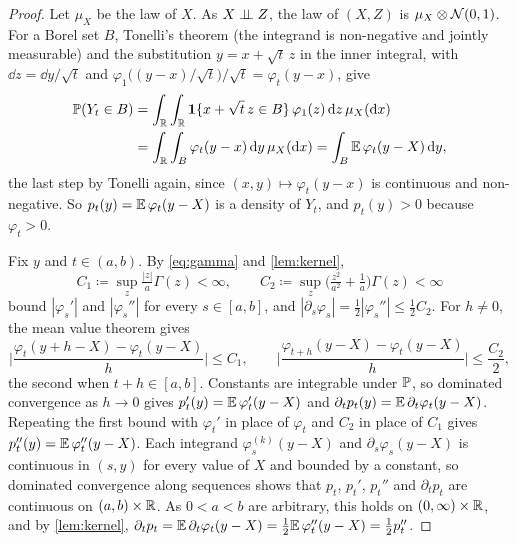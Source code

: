 \documentclass{saim-blog}
\begin{document}
\begin{proof}
Let $\mu_X$ be the law of $X$. As $X\mathrel{\perp\!\!\!\perp} Z$, the law of $(X,Z)$ is $\mu_X\otimes\mathcal{N}(0,1)$. For a Borel set $B$, Tonelli's theorem (the integrand is non-negative and jointly measurable) and the substitution $y=x+\sqrt t\,z$ in the inner integral, with $\dd z=\dd y/\sqrt t$ and $\varphi_1\big((y-x)/\sqrt t\big)/\sqrt t=\varphi_t(y-x)$, give
\[
\begin{aligned}
\mathbb{P}(Y_t\in B)&=\int_{\mathbb{R}}\int_{\mathbb{R}}\mathbf{1}\{x+\sqrt t\,z\in B\}\,\varphi_1(z)\mathop{}\!\mathrm{d} z\,\mu_X(\mathop{}\!\mathrm{d} x)\\
&=\int_{\mathbb{R}}\int_B\varphi_t(y-x)\mathop{}\!\mathrm{d} y\,\mu_X(\mathop{}\!\mathrm{d} x)
=\int_B\mathbb{E}\,\varphi_t(y-X)\mathop{}\!\mathrm{d} y,
\end{aligned}
\]
the last step by Tonelli again, since $(x,y)\mapsto\varphi_t(y-x)$ is continuous and non-negative. So $p_t(y)=\mathbb{E}\,\varphi_t(y-X)$ is a density of $Y_t$, and $p_t(y)>0$ because $\varphi_t>0$.

Fix $y$ and $t\in(a,b)$. By \eqref{eq:gamma} and \cref{lem:kernel},
\[
C_1\coloneqq\sup_{z}\tfrac{|z|}{a}\Gamma(z)<\infty,\qquad
C_2\coloneqq\sup_z\big(\tfrac{z^2}{a^2}+\tfrac1a\big)\Gamma(z)<\infty
\]
bound $|\varphi_s'|$ and $|\varphi_s''|$ for every $s\in[a,b]$, and $|\partial_s\varphi_s|=\tfrac12|\varphi_s''|\le\tfrac12C_2$. For $h\ne0$, the mean value theorem gives
\[
\Big|\frac{\varphi_t(y+h-X)-\varphi_t(y-X)}{h}\Big|\le C_1,
\qquad
\Big|\frac{\varphi_{t+h}(y-X)-\varphi_t(y-X)}{h}\Big|\le\frac{C_2}2,
\]
the second when $t+h\in[a,b]$.
Constants are integrable under $\mathbb{P}$, so dominated convergence as $h\to0$ gives $p_t'(y)=\mathbb{E}\,\varphi_t'(y-X)$ and $\partial_tp_t(y)=\mathbb{E}\,\partial_t\varphi_t(y-X)$. Repeating the first bound with $\varphi_t'$ in place of $\varphi_t$ and $C_2$ in place of $C_1$ gives $p_t''(y)=\mathbb{E}\,\varphi_t''(y-X)$. Each integrand $\varphi^{(k)}_s(y-X)$ and $\partial_s\varphi_s(y-X)$ is continuous in $(s,y)$ for every value of $X$ and bounded by a constant, so dominated convergence along sequences shows that $p_t$, $p_t'$, $p_t''$ and $\partial_tp_t$ are continuous on $(a,b)\times\mathbb{R}$. As $0<a<b$ are arbitrary, this holds on $(0,\infty)\times\mathbb{R}$, and by \cref{lem:kernel}, $\partial_tp_t=\mathbb{E}\,\partial_t\varphi_t(y-X)=\tfrac12\mathbb{E}\,\varphi_t''(y-X)=\tfrac12p_t''$.


\end{proof}
\end{document}
